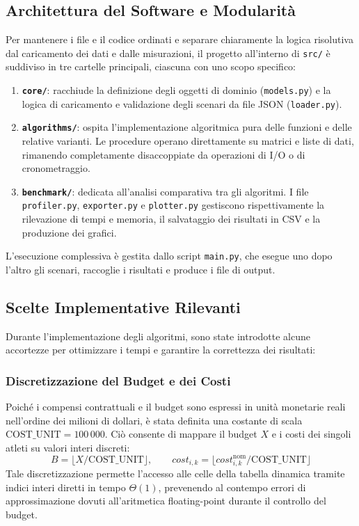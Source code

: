 \subsection{Architettura del Software e Modularità}
Per mantenere i file e il codice ordinati e separare chiaramente la logica risolutiva dal caricamento dei dati e dalle misurazioni, il progetto all'interno di \texttt{src/} è suddiviso in tre cartelle principali, ciascuna con uno scopo specifico:
\begin{enumerate}
	\item \textbf{\texttt{core/}}: racchiude la definizione degli oggetti di dominio (\texttt{models.py}) e la logica di caricamento e validazione degli scenari da file JSON (\texttt{loader.py}).
	\item \textbf{\texttt{algorithms/}}: ospita l'implementazione algoritmica pura delle funzioni e delle relative varianti. Le procedure operano direttamente su matrici e liste di dati, rimanendo completamente disaccoppiate da operazioni di I/O o di cronometraggio.
	\item \textbf{\texttt{benchmark/}}: dedicata all'analisi comparativa tra gli algoritmi. I file \texttt{profiler.py}, \texttt{exporter.py} e \texttt{plotter.py} gestiscono rispettivamente la rilevazione di tempi e memoria, il salvataggio dei risultati in CSV e la produzione dei grafici.
\end{enumerate}
L'esecuzione complessiva è gestita dallo script \texttt{main.py}, che esegue uno dopo l'altro gli scenari, raccoglie i risultati e produce i file di output.

\subsection{Scelte Implementative Rilevanti}
Durante l'implementazione degli algoritmi, sono state introdotte alcune accortezze per ottimizzare i tempi e garantire la correttezza dei risultati:

\subsubsection{Discretizzazione del Budget e dei Costi}
Poiché i compensi contrattuali e il budget sono espressi in unità monetarie reali nell'ordine dei milioni di dollari, è stata definita una costante di scala $\text{COST\_UNIT} = 100\,000$. Ciò consente di mappare il budget $X$ e i costi dei singoli atleti su valori interi discreti:
\begin{equation}
	B = \lfloor X / \text{COST\_UNIT} \rfloor, \qquad \mathit{cost}_{i, k} = \lfloor \mathit{cost}_{i, k}^{\text{nom}} / \text{COST\_UNIT} \rfloor
\end{equation}
Tale discretizzazione permette l'accesso alle celle della tabella dinamica tramite indici interi diretti in tempo $\Theta(1)$, prevenendo al contempo errori di approssimazione dovuti all'aritmetica floating-point durante il controllo del budget.


